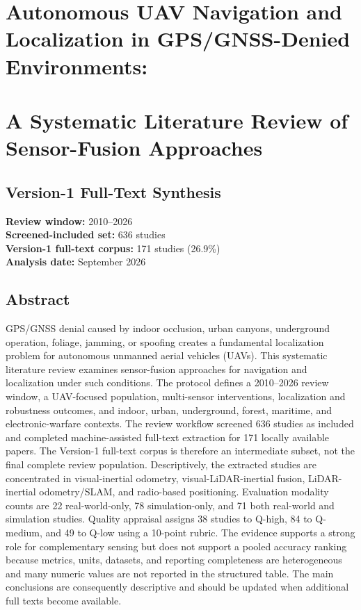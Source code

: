 \documentclass[
  journal]{IEEEtran}
\author{}
\date{}
\begin{document}
\section{Autonomous UAV Navigation and Localization in GPS/GNSS-Denied
Environments:}\label{autonomous-uav-navigation-and-localization-in-gpsgnss-denied-environments}

\section{A Systematic Literature Review of Sensor-Fusion
Approaches}\label{a-systematic-literature-review-of-sensor-fusion-approaches}

\subsection{Version-1 Full-Text
Synthesis}\label{version-1-full-text-synthesis}

\textbf{Review window:} 2010--2026\\
\textbf{Screened-included set:} 636 studies\\
\textbf{Version-1 full-text corpus:} 171 studies (26.9\%)\\
\textbf{Analysis date:} September 2026

\subsection{Abstract}\label{abstract}

GPS/GNSS denial caused by indoor occlusion, urban canyons, underground
operation, foliage, jamming, or spoofing creates a fundamental
localization problem for autonomous unmanned aerial vehicles (UAVs).
This systematic literature review examines sensor-fusion approaches for
navigation and localization under such conditions. The protocol defines
a 2010--2026 review window, a UAV-focused population, multi-sensor
interventions, localization and robustness outcomes, and indoor, urban,
underground, forest, maritime, and electronic-warfare contexts. The
review workflow screened 636 studies as included and completed
machine-assisted full-text extraction for 171 locally available papers.
The Version-1 full-text corpus is therefore an intermediate subset, not
the final complete review population. Descriptively, the extracted
studies are concentrated in visual-inertial odometry,
visual-LiDAR-inertial fusion, LiDAR-inertial odometry/SLAM, and
radio-based positioning. Evaluation modality counts are 22
real-world-only, 78 simulation-only, and 71 both real-world and
simulation studies. Quality appraisal assigns 38 studies to Q-high, 84
to Q-medium, and 49 to Q-low using a 10-point rubric. The evidence
supports a strong role for complementary sensing but does not support a
pooled accuracy ranking because metrics, units, datasets, and reporting
completeness are heterogeneous and many numeric values are not reported
in the structured table. The main conclusions are consequently
descriptive and should be updated when additional full texts become
available.
\end{document}
